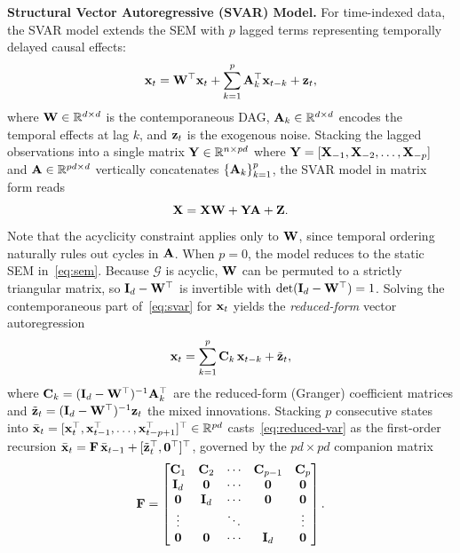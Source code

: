 \documentclass[journal,twoside]{IEEEtran}
\begin{document}
\noindent \textbf{Structural Vector Autoregressive (SVAR) Model.} For
time-indexed data, the SVAR model extends the SEM with $p$ lagged terms
representing temporally delayed causal effects:
\begin{equation}
\label{eq:svar}
{\ensuremath{\mathbf x}}_t = {\mathbf W}^\top {\ensuremath{\mathbf x}}_t + \sum_{k=1}^{p} {\mathbf A}_k^\top
{\ensuremath{\mathbf x}}_{t-k} + {\mathbf z}_t,
\end{equation}
where ${\mathbf W} \in \mathbb{R}^{d \times d}$ is the contemporaneous DAG,
${\mathbf A}_k \in \mathbb{R}^{d \times d}$ encodes the temporal effects at
lag $k$, and ${\mathbf z}_t$ is the exogenous noise. Stacking the lagged
observations into a single matrix ${\mathbf Y} \in \mathbb{R}^{n \times pd}$
where ${\mathbf Y} = [{\mathbf X}_{-1}, {\mathbf X}_{-2}, \ldots, {\mathbf X}_{-p}]$ and
${\mathbf A} \in \mathbb{R}^{pd \times d}$ vertically concatenates
$\{{\mathbf A}_k\}_{k=1}^{p}$, the SVAR model in matrix form reads
\begin{equation}
\label{eq:svar-matrix}
{\ensuremath{\mathbf X}} = {\mathbf X}{\mathbf W} + {\mathbf Y}{\mathbf A} + {\mathbf Z}.
\end{equation}
Note that the acyclicity constraint applies only to ${\mathbf W}$, since
temporal ordering naturally rules out cycles in ${\mathbf A}$. When $p = 0$,
the model reduces to the static SEM in~\eqref{eq:sem}. Because $\mathcal{G}$ is acyclic, ${\mathbf W}$ can be
permuted to a strictly triangular matrix, so ${\mathbf I}_d - {\mathbf W}^\top$ is invertible
with $\det({\mathbf I}_d - {\mathbf W}^\top) = 1$. Solving the contemporaneous part
of~\eqref{eq:svar} for ${\mathbf x}_t$ yields the \emph{reduced-form} vector
autoregression
\begin{equation}
\label{eq:reduced-var}
{\ensuremath{\mathbf x}}_t = \sum_{k=1}^{p} {\mathbf C}_k\,{\mathbf x}_{t-k} + \tilde{{\mathbf z}}_t,
\end{equation}
where ${\mathbf C}_k = ({\mathbf I}_d - {\mathbf W}^\top)^{-1}{\mathbf A}_k^\top$ are the reduced-form
(Granger) coefficient matrices and
$\tilde{{\mathbf z}}_t = ({\mathbf I}_d - {\mathbf W}^\top)^{-1}{\mathbf z}_t$ the mixed innovations. Stacking $p$ consecutive states into
$\bar{{\mathbf x}}_t = [{\mathbf x}_t^\top, {\mathbf x}_{t-1}^\top, \ldots, {\mathbf x}_{t-p+1}^\top]^\top
\in \mathbb{R}^{pd}$ casts~\eqref{eq:reduced-var} as the first-order recursion
$\bar{{\mathbf x}}_t = {\mathbf F}\,\bar{{\mathbf x}}_{t-1} + [\tilde{{\mathbf z}}_t^\top, {\mathbf 0}^\top]^\top$,
governed by the $pd \times pd$ companion matrix
\begin{equation}
\label{eq:companion}
{\ensuremath{\mathbf F}} =
\begin{bmatrix}
{\ensuremath{\mathbf C}}_1 & {\mathbf C}_2 & \cdots & {\mathbf C}_{p-1} & {\mathbf C}_p \\
{\mathbf I}_d & {\mathbf 0} & \cdots & {\mathbf 0} & {\mathbf 0} \\
{\mathbf 0} & {\mathbf I}_d & \cdots & {\mathbf 0} & {\mathbf 0} \\
\vdots & & \ddots & & \vdots \\
{\mathbf 0} & {\mathbf 0} & \cdots & {\mathbf I}_d & {\mathbf 0}
\end{bmatrix}.
\end{equation}
\end{document}
